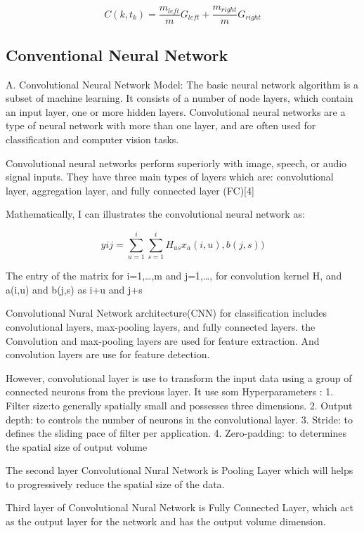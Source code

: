 \begin{Methods}
\begin{equation}
    C(k, t_k) = \frac{m_{left}}{m}G_{left} + \frac{m_{right}}{m}G_{right}
\end{equation}

\subsection{Conventional Neural Network}

A. Convolutional Neural Network Model:
The basic neural network algorithm is a subset of machine learning. It consists of a number of node layers, which contain an input layer, one or more hidden layers. Convolutional neural networks are a type of neural network with more than one layer, and are often used for classification and computer vision tasks.

Convolutional neural networks perform superiorly with image, speech, or audio signal inputs. They have three main types of layers which are: convolutional layer, aggregation layer, and fully connected layer (FC)[4]

Mathematically, I can illustrates the convolutional neural network as:

\[yij=\sum_{u=1}^{i}\sum_{s=1}^{i}H_{us}x_{a}(i, u),b(j, s))\]

The entry of the matrix for i=1,…,m and j=1,…, for convolution kernel H, and a(i,u) and b(j,s) as i+u and j+s


\hfill \break

\hfill \break

Convolutional Nural Network architecture(CNN) for classification includes convolutional layers, max-pooling layers, and fully connected layers. the Convolution and max-pooling layers are used for feature extraction. And convolution layers are use for feature detection.


However, convolutional layer is use to transform the input data using a group of connected neurons from the previous layer. It use som Hyperparameters :
1. Filter size:to generally spatially small and possesses three dimensions.
2. Output depth: to controls the number of neurons in the convolutional layer.
3. Stride: to  defines the sliding pace of filter per application. 
4. Zero-padding: to determines the spatial size of output volume

The second layer Convolutional Nural Network is Pooling Layer which will helps to progressively reduce the spatial size of the data.

Third layer of Convolutional Nural Network is Fully Connected Layer, which act as the output layer for the network and has the output volume dimension.



\end{Methods}


